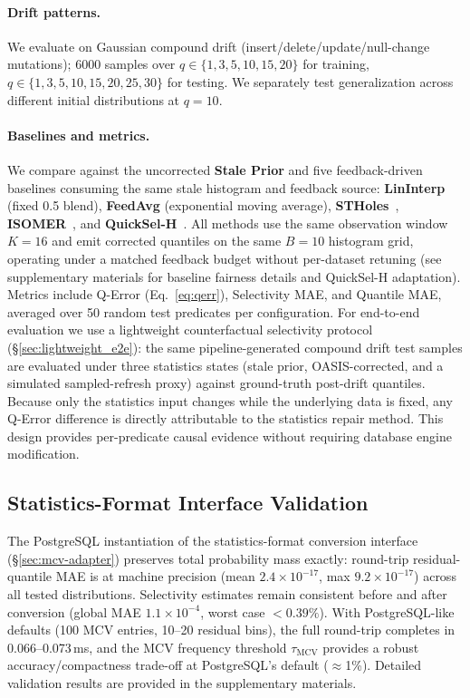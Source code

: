 \documentclass[runningheads]{llncs}
\begin{document}
\paragraph{Drift patterns.}
We evaluate on Gaussian compound drift (insert/delete/update/null-change mutations); 6000 samples over $q{\in}\{1,3,5,10,15,20\}$ for training, $q{\in}\{1,3,5,10,15,20,25,30\}$ for testing. We separately test generalization across different initial distributions at $q{=}10$.

\paragraph{Baselines and metrics.}
We compare against the uncorrected \textbf{Stale Prior} and five feedback-driven baselines consuming the same stale histogram and feedback source: \textbf{LinInterp} (fixed 0.5 blend), \textbf{FeedAvg} (exponential moving average), \textbf{STHoles}~\cite{bruno2001stholes}, \textbf{ISOMER}~\cite{markl2007consistent}, and \textbf{QuickSel-H}~\cite{park2020quicksel}. All methods use the same observation window $K{=}16$ and emit corrected quantiles on the same $B{=}10$ histogram grid, operating under a matched feedback budget without per-dataset retuning (see supplementary materials for baseline fairness details and QuickSel-H adaptation). Metrics include Q-Error (Eq.~\ref{eq:qerr}), Selectivity MAE, and Quantile MAE, averaged over 50 random test predicates per configuration.
For end-to-end evaluation we use a lightweight counterfactual selectivity
protocol (\S\ref{sec:lightweight_e2e}): the same pipeline-generated compound
drift test samples are evaluated under three statistics states (stale prior,
OASIS-corrected, and a simulated sampled-refresh proxy) against ground-truth
post-drift quantiles. Because only the statistics input changes while the
underlying data is fixed, any Q-Error difference is directly attributable to
the statistics repair method. This design provides per-predicate causal
evidence without requiring database engine modification.

\subsection{Statistics-Format Interface Validation}
\label{sec:mcv-validation}

The PostgreSQL instantiation of the statistics-format conversion interface (\S\ref{sec:mcv-adapter}) preserves total probability mass exactly: round-trip residual-quantile MAE is at machine precision (mean $2.4\times10^{-17}$, max $9.2\times10^{-17}$) across all tested distributions. Selectivity estimates remain consistent before and after conversion (global MAE $1.1\times10^{-4}$, worst case $<0.39\%$). With PostgreSQL-like defaults (100 MCV entries, 10--20 residual bins), the full round-trip completes in 0.066--0.073\,ms, and the MCV frequency threshold $\tau_{\text{MCV}}$ provides a robust accuracy/compactness trade-off at PostgreSQL's default ($\approx$1\%). Detailed validation results are provided in the supplementary materials.
\end{document}
